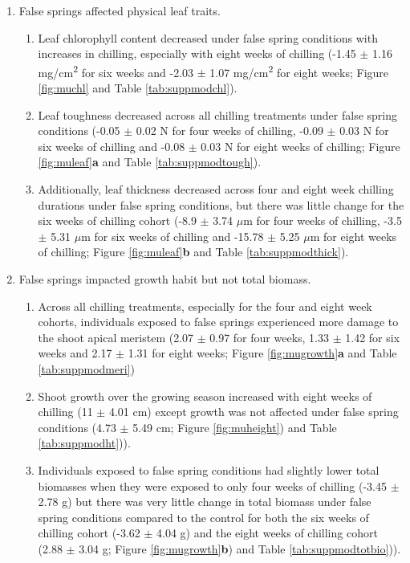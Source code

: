 \documentclass{article}\usepackage[]{graphicx}\usepackage[]{color}
\begin{document}
\begin{enumerate}
\item False springs affected physical leaf traits.
  \begin{enumerate}
  \item Leaf chlorophyll content decreased under false spring conditions with increases in chilling, especially with eight weeks of chilling (-1.45 $\pm$ 1.16 mg/cm\textsuperscript{2} for six weeks and -2.03 $\pm$ 1.07 mg/cm\textsuperscript{2} for eight weeks; Figure \ref{fig:muchl} and Table \ref{tab:suppmodchl}).
  \item Leaf toughness decreased across all chilling treatments under false spring conditions (-0.05 $\pm$ 0.02 N for four weeks of chilling, -0.09 $\pm$ 0.03 N for six weeks of chilling and -0.08 $\pm$ 0.03 N for eight weeks of chilling; Figure \ref{fig:muleaf}\textbf{a} and Table \ref{tab:suppmodtough}).
  \item Additionally, leaf thickness decreased across four and eight week chilling durations under false spring conditions, but there was little change for the six weeks of chilling cohort (-8.9 $\pm$ 3.74 $\mu$m for four weeks of chilling, -3.5 $\pm$ 5.31 $\mu$m for six weeks of chilling and -15.78 $\pm$ 5.25 $\mu$m for eight weeks of chilling; Figure \ref{fig:muleaf}\textbf{b} and Table \ref{tab:suppmodthick}).
  \end{enumerate}
  
\item False springs impacted growth habit but not total biomass. %
  \begin{enumerate}
  \item Across all chilling treatments, especially for the four and eight week cohorts, individuals exposed to false springs experienced more damage to the shoot apical meristem (2.07 $\pm$ 0.97 for four weeks, 1.33 $\pm$ 1.42 for six weeks and 2.17 $\pm$ 1.31 for eight weeks; Figure \ref{fig:mugrowth}\textbf{a} and Table \ref{tab:suppmodmeri}) 
  \item Shoot growth over the growing season increased with eight weeks of chilling (11 $\pm$ 4.01 cm) except growth was not affected under false spring conditions (4.73 $\pm$ 5.49 cm; Figure \ref{fig:muheight}) and Table \ref{tab:suppmodht})).
  \item Individuals exposed to false spring conditions had slightly lower total biomasses when they were exposed to only four weeks of chilling (-3.45 $\pm$ 2.78 g) but there was very little change in total biomass under false spring conditions compared to the control for both the six weeks of chilling cohort (-3.62 $\pm$ 4.04 g) and the eight weeks of chilling cohort (2.88 $\pm$ 3.04 g; Figure \ref{fig:mugrowth}\textbf{b}) and Table \ref{tab:suppmodtotbio})).
  \end{enumerate}
  

\end{enumerate}
\end{document}
